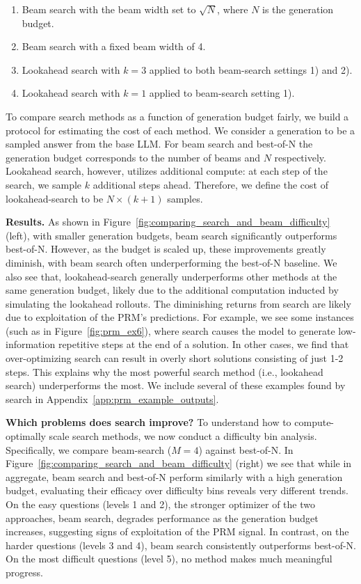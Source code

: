 \renewcommand\labelenumi{\theenumi)}
\begin{enumerate}
\vspace{-0.35cm}
    \item Beam search with the beam width set to $\sqrt{N}$, where $N$ is the generation budget.
    \item Beam search with a fixed beam width of 4.
    \item Lookahead search with $k=3$ applied to both beam-search settings 1) and 2).
    \item Lookahead search with $k=1$ applied to beam-search setting 1). \vspace{-0.3cm}
\end{enumerate}
To compare search methods as a function of generation budget fairly, we build a protocol for estimating the cost of each method. We consider a generation to be a sampled answer from the base LLM. For beam search and best-of-N the generation budget corresponds to the number of beams and $N$ respectively. Lookahead search, however, utilizes additional compute: at each step of the search, we sample $k$ additional steps ahead. Therefore, we define the cost of lookahead-search to be $N \times (k+1)$ samples. 

\textbf{Results.} As shown in Figure~\ref{fig:comparing_search_and_beam_difficulty} (left), with smaller generation budgets, beam search significantly outperforms best-of-N. However, as the budget is scaled up, these improvements greatly diminish, with beam search often underperforming the best-of-N baseline. We also see that, lookahead-search generally underperforms other methods at the same generation budget, likely due to the additional computation inducted by simulating the lookahead rollouts.
The diminishing returns from search are likely due to exploitation of the PRM's predictions. For example, we see some instances (such as in Figure~\ref{fig:prm_ex6}), where search causes the model to generate low-information repetitive steps at the end of a solution. In other cases, we find that over-optimizing search can result in overly short solutions consisting of just 1-2 steps.
This explains why the most powerful search method (i.e., lookahead search) underperforms the most. We include several of these examples found by search in Appendix~\ref{app:prm_example_outputs}.

\textbf{Which problems does search improve?} To understand how to compute-optimally scale search methods, we now conduct a difficulty bin analysis. Specifically, we compare beam-search ($M=4$) against best-of-N. In Figure~\ref{fig:comparing_search_and_beam_difficulty} (right) we see that while in aggregate, beam search and best-of-N perform similarly with a high generation budget, evaluating their efficacy over difficulty bins reveals very different trends.
On the easy questions (levels 1 and 2), the stronger optimizer of the two approaches, beam search, degrades performance as the generation budget increases, suggesting signs of exploitation of the PRM signal.
In contrast, on the harder questions (levels 3 and 4), beam search consistently outperforms best-of-N. On the most difficult questions (level 5), no method makes much meaningful progress. 

